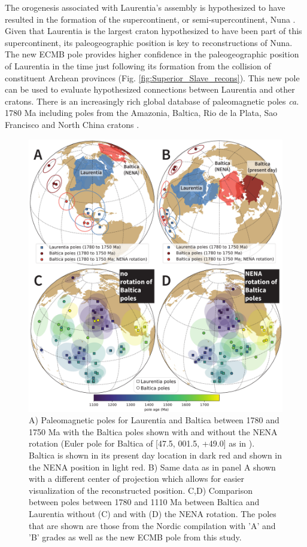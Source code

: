 \documentclass[draft]{agujournal2019}
\begin{document}
The orogenesis associated with Laurentia's assembly is hypothesized to have resulted in the formation of the supercontinent, or semi-supercontinent, Nuna \cite{Hoffman1997a, Evans2011a}. Given that Laurentia is the largest craton hypothesized to have been part of this supercontinent, its paleogeographic position is key to reconstructions of Nuna. The new ECMB pole provides higher confidence in the paleogeographic position of Laurentia in the time just following its formation from the collision of constituent Archean provinces (Fig. \ref{fig:Superior_Slave_recons}). This new pole can be used to evaluate hypothesized connections between Laurentia and other cratons. There is an increasingly rich global database of paleomagnetic poles \textit{ca.} 1780 Ma including poles from the Amazonia, Baltica, Rio de la Plata, Sao Francisco and North China cratons \cite{Zhang2012a, Xu2014a, Bispo-Santos2014a, DAgrella-Filho2020a}.

\begin{figure}[!ht]
\noindent\includegraphics[width=\textwidth]{./figures/Laurentia_Baltica.pdf}
\caption{\small{A) Paleomagnetic poles for Laurentia and Baltica between 1780 and 1750 Ma with the Baltica poles shown with and without the NENA rotation (Euler pole for Baltica of [47.5\textdegree, 001.5\textdegree, +49.0\textdegree] as in ). Baltica is shown in its present day location in dark red and shown in the NENA position in light red. B) Same data as in panel A shown with a different center of projection which allows for easier visualization of the reconstructed position. C,D) Comparison between poles between 1780 and 1110 Ma between Baltica and Laurentia without (C) and with (D) the NENA rotation. The poles that are shown are those from the Nordic compilation with 'A' and 'B' grades as well as the new ECMB pole from this study.}}
\label{fig:Laurentia_Baltica}
\end{figure}
\end{document}
